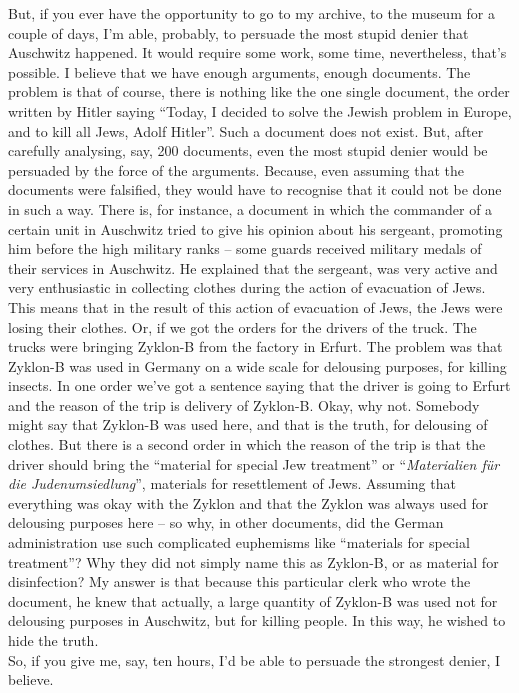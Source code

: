 But, if you ever have the opportunity to go to my archive, to the museum for a couple of days, I’m able, probably, to persuade the most stupid denier that Auschwitz happened. It would require some work, some time, nevertheless, that’s possible. I believe that we have enough arguments, enough documents. The problem is that of course, there is nothing like the one single document, the order written by Hitler saying ``Today, I decided to solve the Jewish problem in Europe, and to kill all Jews, Adolf Hitler''. Such a document does not exist. But, after carefully analysing, say, 200 documents, even the most stupid denier would be persuaded by the force of the arguments. Because, even assuming that the documents were falsified, they would have to recognise that it could not be done in such a way. There is, for instance, a document in which the commander of a certain unit in Auschwitz tried to give his opinion about his sergeant, promoting him before the high military ranks – some guards received military medals of their services in Auschwitz. He explained that the sergeant, was very active and very enthusiastic in collecting clothes during the action of evacuation of Jews. This means that in the result of this action of evacuation of Jews, the Jews were losing their clothes. Or, if we got the orders for the drivers of the truck. The trucks were bringing Zyklon-B from the factory in Erfurt. The problem was that Zyklon-B was used in Germany on a wide scale for delousing purposes, for killing insects. In one order we’ve got a sentence saying that the driver is going to Erfurt and the reason of the trip is delivery of Zyklon-B. Okay, why not. Somebody might say that Zyklon-B was used here, and that is the truth, for delousing of clothes. But there is a second order in which the reason of the trip is that the driver should bring the ``material for special Jew treatment'' or ``\textit{Materialien für die Judenumsiedlung}'', materials for resettlement of Jews. Assuming that everything was okay with the Zyklon and that the Zyklon was always used for delousing purposes here – so why, in other documents, did the German administration use such complicated euphemisms like ``materials for special treatment''? Why they did not simply name this as Zyklon-B, or as material for disinfection? My answer is that because this particular clerk who wrote the document, he knew that actually, a large quantity of Zyklon-B was used not for delousing purposes in Auschwitz, but for killing people. In this way, he wished to hide the truth. \\
So, if you give me, say, ten hours, I’d be able to persuade the strongest denier, I believe.